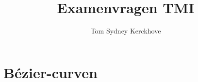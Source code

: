 \documentclass[12pt,a4paper]{article}
\author{Tom Sydney Kerckhove}
\title{Examenvragen TMI}
\begin{document}
\pagebreak



\iffalse
\part{B\'ezier-curven}
\iffalse
\section{Bespreek $C^{2}$ Continu\"iteit.}
\section{Hoe bekomt men $C^{2}$ continu\"iteit bij samengestelde b\'ezier curven?}
\section{Geef het algoritm van de Casteljau en bewijs de correctheid ervan.}
\section{Bespreek de variatieverminderingseigenschap.}
\section{Wat betekent de variatieverminderingseigenschap voor B\'ezier curven?}
\section{Wat betekent de variatieverminderingseigenschap voor splines?}
\section{Bespreek subdivisie en geef de methode.}
\section{Bespreek graadverhoding, geef het bewijs en leg uit waarvoor het dient.}
\section{Bespreek tensorproductoppervlakken aan de hand van B\'ezier-oppervlakken.}
\section{Bereken de tweede partiele afgeleide in de hoekpunten van een B\'ezier-oppervlak, leg uit en geef grafisch weer.}
\fi
\end{document}
